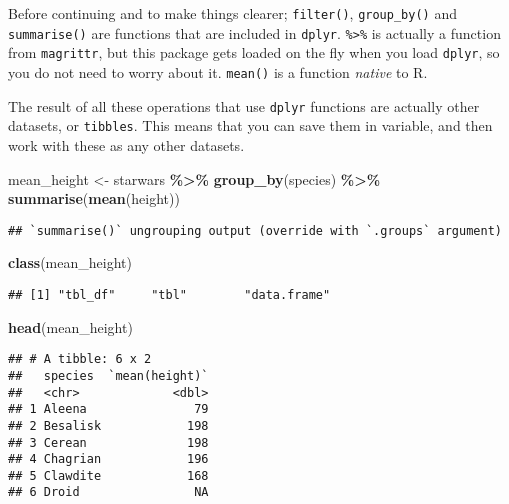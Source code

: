 \documentclass[
]{article}
\newenvironment{Shaded}{\begin{snugshade}}{\end{snugshade}}
\newcommand{\KeywordTok}[1]{\textcolor[rgb]{0.13,0.29,0.53}{\textbf{#1}}}
\newcommand{\NormalTok}[1]{#1}
\newcommand{\OperatorTok}[1]{\textcolor[rgb]{0.81,0.36,0.00}{\textbf{#1}}}
\newcommand{\StringTok}[1]{\textcolor[rgb]{0.31,0.60,0.02}{#1}}
\begin{document}
Before continuing and to make things clearer; \texttt{filter()}, \texttt{group\_by()} and \texttt{summarise()} are
functions that are included in \texttt{dplyr}. \texttt{\%\textgreater{}\%} is actually a function from \texttt{magrittr}, but this
package gets loaded on the fly when you load \texttt{dplyr}, so you do not need to worry about it.
\texttt{mean()} is a function \emph{native} to R.

The result of all these operations that use \texttt{dplyr} functions are actually other datasets, or
\texttt{tibbles}. This means that you can save them in variable, and then work with these as any other
datasets.

\begin{Shaded}
\begin{Highlighting}[]
\NormalTok{mean\_height \textless{}{-}}\StringTok{ }\NormalTok{starwars }\OperatorTok{\%\textgreater{}\%}
\StringTok{  }\KeywordTok{group\_by}\NormalTok{(species) }\OperatorTok{\%\textgreater{}\%}
\StringTok{  }\KeywordTok{summarise}\NormalTok{(}\KeywordTok{mean}\NormalTok{(height))}
\end{Highlighting}
\end{Shaded}

\begin{verbatim}
## `summarise()` ungrouping output (override with `.groups` argument)
\end{verbatim}

\begin{Shaded}
\begin{Highlighting}[]
\KeywordTok{class}\NormalTok{(mean\_height)}
\end{Highlighting}
\end{Shaded}

\begin{verbatim}
## [1] "tbl_df"     "tbl"        "data.frame"
\end{verbatim}

\begin{Shaded}
\begin{Highlighting}[]
\KeywordTok{head}\NormalTok{(mean\_height)}
\end{Highlighting}
\end{Shaded}

\begin{verbatim}
## # A tibble: 6 x 2
##   species  `mean(height)`
##   <chr>             <dbl>
## 1 Aleena               79
## 2 Besalisk            198
## 3 Cerean              198
## 4 Chagrian            196
## 5 Clawdite            168
## 6 Droid                NA
\end{verbatim}
\end{document}
